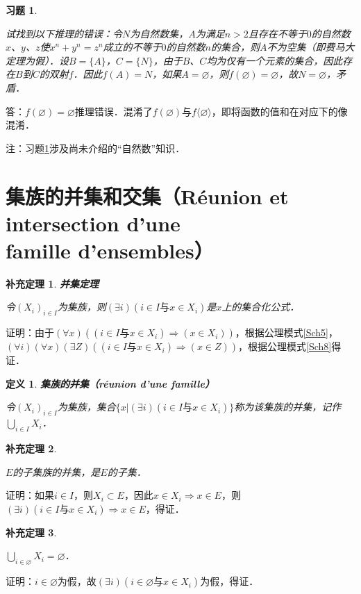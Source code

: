 \documentclass[12pt, a4paper, oneside]{book}
\newtheorem{cor}{补充定理}
\newtheorem{de}{定义}
\newtheorem{exer}{习题}
\begin{document}
			\begin{exer}\label{exer53}
				\hfill\par
				试找到以下推理的错误：令$N$为自然数集，$A$为满足$n>2$且存在不等于$0$的自然数$x$、$y$、$z$使$x^n+y^n=z^n$成立的不等于$0$的自然数$n$的集合，则$A$不为空集（即费马大定理为假）．设$B=\{A\}$，$C=\{N\}$，由于$B$、$C$均为仅有一个元素的集合，因此存在$B$到$C$的双射$f$．因此$f(A)=N$，如果$A=\varnothing$，则$f(\varnothing)=\varnothing$，故$N=\varnothing$，矛盾．
			\end{exer}
			答：$f(\varnothing)=\varnothing$推理错误．混淆了$f(\varnothing)$与$f\langle\varnothing\rangle$，即将函数的值和在对应下的像混淆．
			\par
			注：习题\ref{exer53}涉及尚未介绍的“自然数”知识．

		\section{\texorpdfstring{集族的并集和交集（Réunion et intersection d'une \\famille d'ensembles）}{集族的并集和交集（Réunion et intersection d'une famille d'ensembles）}}
						
			\begin{cor}\label{cor89}
				\textbf{并集定理}
				\par
				令$(X_i)_{i\in I}$为集族，则$(\exists i)(i\in I\text{与}x\in X_i)$是$x$上的集合化公式．
			\end{cor}
			证明：由于$(\forall x)((i\in I\text{与}x\in X_i)\Rightarrow (x\in X_i))$，根据公理模式\ref{Sch5}，$(\forall i)(\forall x)(\exists Z)((i\in I\text{与}x\in X_i)\Rightarrow (x\in Z))$，根据公理模式\ref{Sch8}得证．
			
			\begin{de}
				\textbf{集族的并集（réunion d'une famille）}
				\par
				令$(X_i)_{i\in I}$为集族，集合$\{x|(\exists i)(i\in I\text{与}x\in X_i)\}$称为该集族的并集，记作$\bigcup\limits_{i\in I}X_i$．
				
			\end{de}
			
			\begin{cor}\label{cor90}
				\hfill\par
				$E$的子集族的并集，是$E$的子集．
			\end{cor}
			证明：如果$i\in I$，则$X_i\subset E$，因此$x\in X_i\Rightarrow x\in E$，则$(\exists i)(i\in I\text{与}x\in X_i)\Rightarrow x\in E$，得证．
			
			\begin{cor}\label{cor91}
				\hfill\par
				$\bigcup\limits_{i\in \varnothing}X_i=\varnothing$．
			\end{cor}
			证明：$i\in \varnothing$为假，故$(\exists i)(i\in \varnothing\text{与}x\in X_i)$为假，得证．
			
\end{document}
